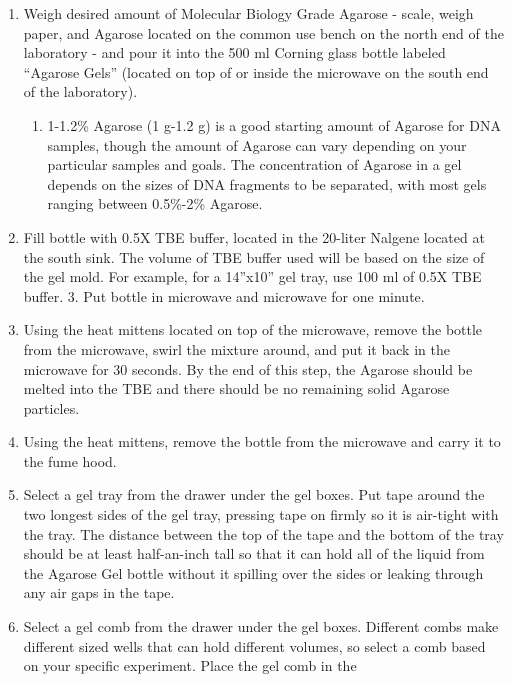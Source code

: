 \documentclass[
  letterpaper,
  DIV=11,
  numbers=noendperiod]{scrreprt}
\providecommand{\tightlist}{%
  \setlength{\itemsep}{0pt}\setlength{\parskip}{0pt}}\usepackage{longtable,booktabs,array}
\begin{document}
\begin{enumerate}
\def\labelenumi{\arabic{enumi}.}
\item
  Weigh desired amount of Molecular Biology Grade Agarose - scale, weigh
  paper, and Agarose located on the common use bench on the north end of
  the laboratory - and pour it into the 500 ml Corning glass bottle
  labeled ``Agarose Gels'' (located on top of or inside the microwave on
  the south end of the laboratory).

  \begin{enumerate}
  \def\labelenumii{\alph{enumii}.}
  \tightlist
  \item
    1-1.2\% Agarose (1 g-1.2 g) is a good starting amount of Agarose for
    DNA samples, though the amount of Agarose can vary depending on your
    particular samples and goals. The concentration of Agarose in a gel
    depends on the sizes of DNA fragments to be separated, with most
    gels ranging between 0.5\%-2\% Agarose.
  \end{enumerate}
\item
  Fill bottle with 0.5X TBE buffer, located in the 20-liter Nalgene
  located at the south sink. The volume of TBE buffer used will be based
  on the size of the gel mold. For example, for a 14''x10'' gel tray,
  use 100 ml of 0.5X TBE buffer. 3. Put bottle in microwave and
  microwave for one minute.
\item
  Using the heat mittens located on top of the microwave, remove the
  bottle from the microwave, swirl the mixture around, and put it back
  in the microwave for 30 seconds. By the end of this step, the Agarose
  should be melted into the TBE and there should be no remaining solid
  Agarose particles.
\item
  Using the heat mittens, remove the bottle from the microwave and carry
  it to the fume hood.
\item
  Select a gel tray from the drawer under the gel boxes. Put tape around
  the two longest sides of the gel tray, pressing tape on firmly so it
  is air-tight with the tray. The distance between the top of the tape
  and the bottom of the tray should be at least half-an-inch tall so
  that it can hold all of the liquid from the Agarose Gel bottle without
  it spilling over the sides or leaking through any air gaps in the
  tape.
\item
  Select a gel comb from the drawer under the gel boxes. Different combs
  make different sized wells that can hold different volumes, so select
  a comb based on your specific experiment. Place the gel comb in the

\end{enumerate}
\end{document}
